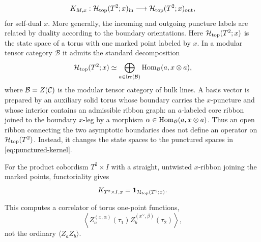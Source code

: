 \documentclass[11pt]{article}
\numberwithin{equation}{section}
\begin{document}
\begin{equation}
K_{M,x}:\mathcal H_{\mathrm{top}}(T^2;x)_{\mathrm{in}}
\longrightarrow
\mathcal H_{\mathrm{top}}(T^2;x)_{\mathrm{out}},
\label{eq:punctured-kernel}
\end{equation}
for self-dual $x$. More generally, the incoming and outgoing puncture labels are related by duality according to the boundary orientations. Here $\mathcal H_{\mathrm{top}}(T^2;x)$ is the state space of a torus with one marked point labeled by $x$. In a modular tensor category $\mathcal B$ it admits the standard decomposition
\begin{equation}
\mathcal H_{\mathrm{top}}(T^2;x)
\simeq
\bigoplus_{a\in\mathrm{Irr}(\mathcal B)}
\mathrm{Hom}_{\mathcal B}(a,x\otimes a),
\label{eq:punctured-torus-space}
\end{equation}
where $\mathcal B=Z(\mathcal C)$ is the modular tensor category of bulk lines. A basis vector is prepared by an auxiliary solid torus whose boundary carries the $x$-puncture and whose interior contains an admissible ribbon graph: an $a$-labeled core ribbon joined to the boundary $x$-leg by a morphism $\alpha\in\mathrm{Hom}_{\mathcal B}(a,x\otimes a)$. Thus an open ribbon connecting the two asymptotic boundaries does not define an operator on $\mathcal H_{\mathrm{top}}(T^2)$. Instead, it changes the state spaces to the punctured spaces in \eqref{eq:punctured-kernel}.

For the product cobordism $T^2\times I$ with a straight, untwisted $x$-ribbon joining the marked points, functoriality gives
\begin{equation}
K_{T^2\times I,x}=\mathbf 1_{\mathcal H_{\mathrm{top}}(T^2;x)}.
\label{eq:punctured-cylinder-identity}
\end{equation}

This computes a correlator of torus one-point functions,
\begin{equation}
\left\langle Z_a^{(x,\alpha)}(\tau_1)
Z_b^{(x^\vee,\beta)}(\tau_2)\right\rangle,
\label{eq:puncturedcorr}
\end{equation}
not the ordinary \(\langle Z_aZ_b\rangle\).
\end{document}
